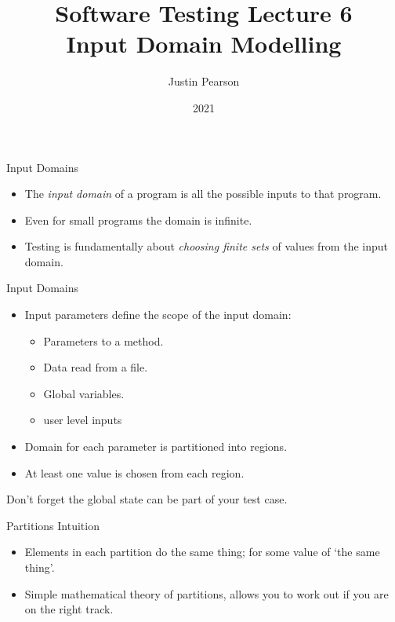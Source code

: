 \documentclass{beamer}
\title{Software Testing  Lecture 6 \\ Input Domain Modelling}
\author{Justin Pearson}
\date{2021}
\begin{document}
\lstset{language=C}

\begin{frame}
  \maketitle
\end{frame}
\begin{frame}{Input Domains}
  \begin{itemize}
  \item The {\it input domain} of a program is all the possible inputs to
    that program.
  \item Even for small programs the domain is infinite.
  \item Testing is fundamentally about {\em choosing finite sets} of
    values from the input domain.
  \end{itemize}
  
\end{frame}
\begin{frame}{Input Domains}
  \begin{itemize}
  \item Input parameters define the scope of the input domain:
    \begin{itemize}
    \item Parameters to a method.
    \item Data read from a file.
    \item Global variables.
    \item user level inputs
    \end{itemize}
  \item Domain for each parameter is partitioned into regions.
  \item At least one value is chosen from each region.
  \end{itemize}
  Don't forget the global state can be part of your test case.  
\end{frame}
\begin{frame}{Partitions Intuition} 
  \begin{itemize}
  \item Elements in each partition do the same thing; for some value
    of  `the same thing'.
  \item Simple mathematical theory of partitions, allows you to work
    out if you are on the right track.
  \end{itemize}
\end{frame}
\end{document}
